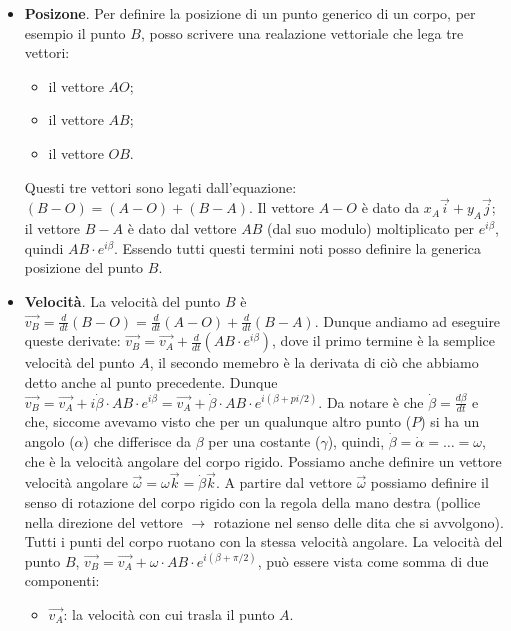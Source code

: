 \begin{itemize}
    \item \textbf{Posizone}. Per definire la posizione di un punto generico di un corpo, per esempio il punto $B$, posso scrivere una realazione vettoriale che lega tre vettori:
    \begin{itemize}
        \item il vettore $AO$;
        \item il vettore $AB$;
        \item il vettore $OB$.
    \end{itemize}
    Questi tre vettori sono legati dall'equazione: $(B-O) = (A-O) + (B-A)$. Il vettore $A-O$ è dato da $x_A \vec{i} + y_A \vec{j}$; il vettore $B-A$ è dato dal vettore $AB$ (dal suo modulo) moltiplicato per $e^{i \beta}$, quindi $AB \cdot e^{i \beta}$. Essendo tutti questi termini noti posso definire la generica posizione del punto $B$.
    \item \textbf{Velocità}. La velocità del punto $B$ è $\vec{v_B} = \frac{d}{dt}(B-O) = \frac{d}{dt}(A-O) + \frac{d}{dt}(B-A)$. Dunque andiamo ad eseguire queste derivate: $\vec{v_B} = \vec{v_A} + \frac{d}{dt} (AB \cdot e^{i \beta})$, dove il primo termine è la semplice velocità del punto $A$, il secondo memebro è la derivata di ciò che abbiamo detto anche al punto precedente. Dunque $\vec{v_B} = \vec{v_A} + i \dot{\beta} \cdot AB \cdot e^{i \beta} = \vec{v_A} + \dot{\beta} \cdot AB \cdot e^{i(\beta + pi/2)}$. Da notare è che $\dot{\beta} = \frac{d \beta}{d t}$ e che, siccome avevamo visto che per un qualunque altro punto ($P$) si ha un angolo ($\alpha$) che differisce da $\beta$ per una costante ($\gamma$), quindi, $\dot{\beta} = \dot{\alpha} = \dots = \omega$, che è la velocità angolare del corpo rigido. Possiamo anche definire un vettore velocità angolare $\vec{\omega} = \omega \vec{k} = \dot{\beta} \vec{k}$.\newline
    A partire dal vettore $\vec{\omega}$ possiamo definire il senso di rotazione del corpo rigido con la regola della mano destra (pollice nella direzione del vettore $\rightarrow $ rotazione nel senso delle dita che si avvolgono).\newline
    Tutti i punti del corpo ruotano con la stessa velocità angolare.\newline
    La velocità del punto $B$, $\vec{v_B} = \vec{v_A} + \omega \cdot AB \cdot e^{i(\beta + \pi/2)}$, può essere vista come somma di due componenti:
    \begin{itemize}
        \item $\vec{v_A}$: la velocità con cui trasla il punto $A$.

\end{itemize}
\end{itemize}

